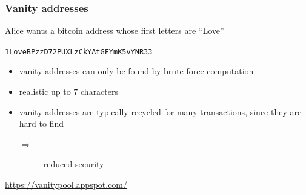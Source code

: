 \documentclass[11pt]{beamer}  %
\begin{document}
\begin{frame}\frametitle{Vanity addresses}

  \begin{greenbox}{Alice wants a bitcoin address whose first letters are ``Love''}
  \begin{center}
    \texttt{1\alert{Love}BPzzD72PUXLzCkYAtGFYmK5vYNR33}
  \end{center}
  \end{greenbox}

  \bigskip

  \begin{itemize}
  \item vanity addresses can only be found by brute-force computation
  \item realistic up to $7$ characters
  \item vanity addresses are typically recycled for many transactions, since
    they are hard to find
    \begin{description}
      \item[$\Rightarrow$] reduced security
    \end{description}
  \end{itemize}

  \bigskip

  \begin{center}
    \url{https://vanitypool.appspot.com/}
  \end{center}

\end{frame}
\end{document}
